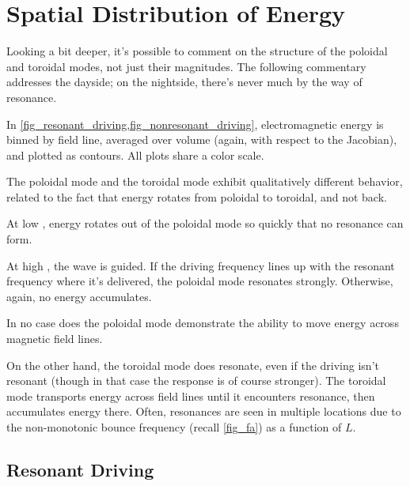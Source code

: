\section{Spatial Distribution of Energy}
  \label{sec_shells}

Looking a bit deeper, it's possible to comment on the structure of the poloidal and toroidal modes, not just their magnitudes. The following commentary addresses the dayside; on the nightside, there's never much by the way of resonance. 

In \cref{fig_resonant_driving,fig_nonresonant_driving}, electromagnetic energy is binned by field line, averaged over volume (again, with respect to the Jacobian), and plotted as contours. All plots share a color scale. 

The poloidal mode and the toroidal mode exhibit qualitatively different behavior, related to the fact that energy rotates from poloidal to toroidal, and not back. 

At low \azm, energy rotates out of the poloidal mode so quickly that no resonance can form. 

At high \azm, the \Alfven wave is guided. If the driving frequency lines up with the resonant frequency where it's delivered, the poloidal mode resonates strongly. Otherwise, again, no energy accumulates. 

In no case does the poloidal mode demonstrate the ability to move energy across magnetic field lines. 

On the other hand, the toroidal mode does resonate, even if the driving isn't resonant (though in that case the response is of course stronger). The toroidal mode transports energy across field lines until it encounters resonance, then accumulates energy there. Often, resonances are seen in multiple locations due to the non-monotonic \Alfven bounce frequency (recall \cref{fig_fa}) as a function of $L$. 

\subsection{Resonant Driving}

